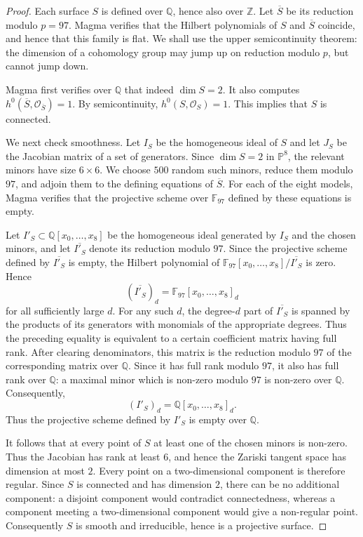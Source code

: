 \documentclass[11pt,a4paper]{article}
\begin{document}
\begin{proof}
Each surface $S$ is defined over $\mathbb Q$, hence also over $\mathbb Z$. Let
$\overline S$ be its reduction modulo $p=97$.
Magma verifies that the Hilbert polynomials of $S$ and $\overline S$ coincide,
and hence that this family is flat.  We shall use the upper semicontinuity theorem:
the dimension of a cohomology group may jump up on reduction modulo
$p$, but cannot jump down.

Magma first verifies over $\mathbb Q$ that indeed $\dim S=2$.
It also computes $h^0(\overline S,\mathcal O_{\overline S})=1$.
By semicontinuity, $h^0(S,\mathcal O_S)=1.$ This implies that $S$ is connected.

We next check smoothness.  Let $I_S$ be the homogeneous ideal of $S$ and
let $J_S$ be the Jacobian matrix of a set of generators.  Since
$\dim S=2$ in $\mathbb P^8$, the relevant minors have size $6\times6$.
We choose $500$ random such minors, reduce them modulo $97$, and adjoin
them to the defining equations of $\overline S$.  For each of the eight
models, Magma verifies that the projective scheme over $\mathbb F_{97}$
defined by these equations is empty.

Let $I'_S\subset\mathbb Q[x_0,\ldots,x_8]$ be the homogeneous ideal
generated by $I_S$ and the chosen minors, and let $\overline{I'_S}$ denote
its reduction modulo $97$.  Since the projective scheme defined by
$\overline{I'_S}$ is empty, the Hilbert polynomial of
$\mathbb F_{97}[x_0,\ldots,x_8]/\overline{I'_S}$ is zero.  Hence
\[
 (\overline{I'_S})_d=\mathbb F_{97}[x_0,\ldots,x_8]_d
\]
for all sufficiently large $d$.  For any such $d$, the degree-$d$ part of
$\overline{I'_S}$ is spanned by the products of its generators with
monomials of the appropriate degrees.  Thus the preceding equality is
equivalent to a certain coefficient matrix having full rank.  After
clearing denominators, this matrix is the reduction modulo $97$ of the
corresponding matrix over $\mathbb Q$.  Since it has full rank modulo $97$,
it also has full rank over $\mathbb Q$: a maximal minor which is non-zero
modulo $97$ is non-zero over $\mathbb Q$.  Consequently,
\[
 (I'_S)_d=\mathbb Q[x_0,\ldots,x_8]_d.
\]
Thus the projective scheme defined by $I'_S$ is empty over $\mathbb Q$.

It follows that at every point of $S$ at least one of the chosen minors is
non-zero.  Thus the Jacobian has rank at least $6$, and hence the Zariski
tangent space has dimension at most $2$.  Every point on a two-dimensional
component is therefore regular.  Since $S$ is connected and has dimension
$2$, there can be no additional component: a disjoint component would
contradict connectedness, whereas a component meeting a two-dimensional
component would give a non-regular point.  Consequently $S$ is smooth and
irreducible, hence is a projective surface.


\end{proof}
\end{document}
